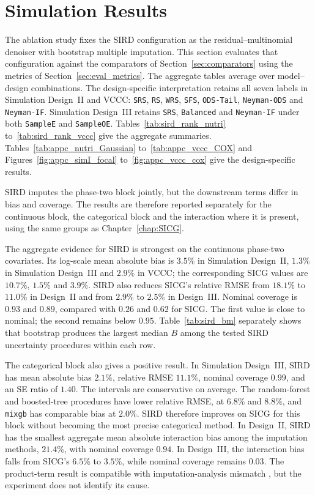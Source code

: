 \section{Simulation Results}
\label{sec:sird_sim}

The ablation study fixes the SIRD configuration as the residual--multinomial denoiser with bootstrap multiple imputation. This section evaluates that configuration against the comparators of Section~\ref{sec:comparators} using the metrics of Section~\ref{sec:eval_metrics}. The aggregate tables average over model--design combinations. The design-specific interpretation retains all seven labels in Simulation Design~II and VCCC: \texttt{SRS}, \texttt{RS}, \texttt{WRS}, \texttt{SFS}, \texttt{ODS-Tail}, \texttt{Neyman-ODS} and \texttt{Neyman-IF}. Simulation Design~III retains \texttt{SRS}, \texttt{Balanced} and \texttt{Neyman-IF} under both \texttt{SampleE} and \texttt{SampleOE}. Tables~\ref{tab:sird_rank_nutri} to~\ref{tab:sird_rank_vccc} give the aggregate summaries. Tables~\ref{tab:appc_nutri_Gaussian} to~\ref{tab:appc_vccc_COX} and Figures~\ref{fig:appc_simI_focal} to~\ref{fig:appc_vccc_cox} give the design-specific results.

SIRD imputes the phase-two block jointly, but the downstream terms differ in bias and coverage. The results are therefore reported separately for the continuous block, the categorical block and the interaction where it is present, using the same groups as Chapter~\ref{chap:SICG}.

The aggregate evidence for SIRD is strongest on the continuous phase-two covariates. Its log-scale mean absolute bias is \(3.5\%\) in Simulation Design~II, \(1.3\%\) in Simulation Design~III and \(2.9\%\) in VCCC; the corresponding SICG values are \(10.7\%\), \(1.5\%\) and \(3.9\%\). SIRD also reduces SICG's relative RMSE from \(18.1\%\) to \(11.0\%\) in Design~II and from \(2.9\%\) to \(2.5\%\) in Design~III. Nominal coverage is \(0.93\) and \(0.89\), compared with \(0.26\) and \(0.62\) for SICG. The first value is close to nominal; the second remains below \(0.95\). Table~\ref{tab:sird_bm} separately shows that bootstrap produces the largest median \(B\) among the tested SIRD uncertainty procedures within each row.

The categorical block also gives a positive result. In Simulation Design~III, SIRD has mean absolute bias \(2.1\%\), relative RMSE \(11.1\%\), nominal coverage \(0.99\), and an SE ratio of \(1.40\). The intervals are conservative on average. The random-forest and boosted-tree procedures have lower relative RMSE, at \(6.8\%\) and \(8.8\%\), and \texttt{mixgb} has comparable bias at \(2.0\%\). SIRD therefore improves on SICG for this block without becoming the most precise categorical method. In Design~II, SIRD has the smallest aggregate mean absolute interaction bias among the imputation methods, \(21.4\%\), with nominal coverage \(0.94\). In Design~III, the interaction bias falls from SICG's \(6.5\%\) to \(3.5\%\), while nominal coverage remains \(0.03\). The product-term result is compatible with imputation-analysis mismatch \citep{meng1994multiple}, but the experiment does not identify its cause.

